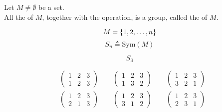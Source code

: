 
\begin{frame}
  \begin{definition}
    Let $M \neq \emptyset$ be a set. \\
    All the  of $M$,
    together with the  operation,
    is a group, called the  of $M$.
  \end{definition}

  \[
    M = \{1, 2, \dots, n\}
  \]
  \[
    S_{n} \triangleq \text{Sym}(M)
  \]
\end{frame}

\begin{frame}{}
  \[
    S_{3}
  \]

  \begin{align*}
    &\begin{pmatrix}
      1 & 2 & 3 \\
      1 & 2 & 3
    \end{pmatrix} \qquad
    \begin{pmatrix}
      1 & 2 & 3 \\
      1 & 3 & 2
    \end{pmatrix} \qquad
    \begin{pmatrix}
      1 & 2 & 3 \\
      3 & 2 & 1
    \end{pmatrix} \\[6pt]
    &\begin{pmatrix}
      1 & 2 & 3 \\
      2 & 1 & 3
    \end{pmatrix} \qquad
    \begin{pmatrix}
      1 & 2 & 3 \\
      3 & 1 & 2
    \end{pmatrix} \qquad
    \begin{pmatrix}
      1 & 2 & 3 \\
      2 & 3 & 1
    \end{pmatrix}
  \end{align*}
\end{frame}

